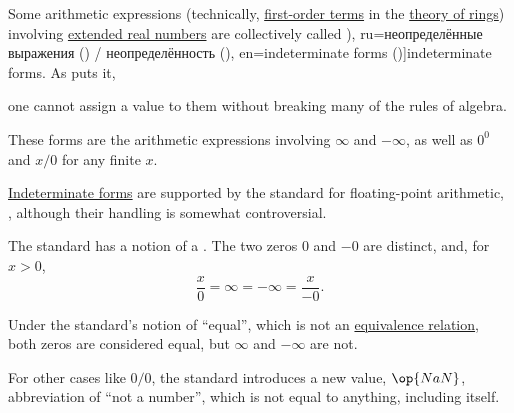 \begin{definition}\label{def:indeterminate_form}\mimprovised
  Some arithmetic expressions (technically, \hyperref[def:fol_term]{first-order terms} in the \hyperref[def:ring/theory]{theory of rings}) involving \hyperref[def:extended_real_numbers]{extended real numbers} are collectively called \term[bg=неопределености (\cite[228]{ИлинСадовничиСендов1984АнализТом1}), ru=неопределённые выражения (\cite[\S 41]{Фихтенгольц1968ОсновыАнализаТом1}) / неопределённость (\cite[235]{ИльинСадовничийСендов1985АнализТом1}), en=indeterminate forms (\cite[12]{Tao2011MeasureTheory})]{indeterminate forms}. As \textcite[12]{Tao2011MeasureTheory} puts it,
  \begin{displayquote}
    \textellipsis one cannot assign a value to them without breaking many of the rules of algebra.
  \end{displayquote}

  These forms are the arithmetic expressions involving \( \infty \) and \( -\infty \), as well as \( 0^0 \) and \( x / 0 \) for any finite \( x \).
\end{definition}

\begin{remark}\label{rem:floating_point_indeterminate_forms}
  \hyperref[def:indeterminate_form]{Indeterminate forms} are supported by the standard for floating-point arithmetic, \cite[31]{IEEE:754:2019}, although their handling is somewhat controversial.

  The standard has a notion of a . The two zeros \( 0 \) and \( -0 \) are distinct, and, for \( x > 0 \),
  \begin{equation*}
    \frac x 0 = \infty = -\infty = \frac x {-0}.
  \end{equation*}

  Under the standard's notion of \enquote{equal}, which is not an \hyperref[def:equivalence_relation]{equivalence relation}, both zeros are considered equal, but \( \infty \) and \( -\infty \) are not.

  For other cases like \( 0 / 0 \), the standard introduces a new value, \( \op{NaN} \), abbreviation of \enquote{not a number}, which is not equal to anything, including itself.
\end{remark}

